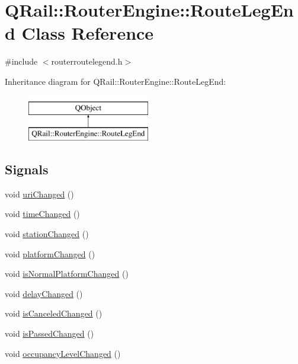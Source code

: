 \hypertarget{classQRail_1_1RouterEngine_1_1RouteLegEnd}{}\section{Q\+Rail\+::Router\+Engine\+::Route\+Leg\+End Class Reference}
\label{classQRail_1_1RouterEngine_1_1RouteLegEnd}


{\ttfamily \#include $<$routerroutelegend.\+h$>$}

Inheritance diagram for Q\+Rail\+::Router\+Engine\+::Route\+Leg\+End\+:\begin{figure}[H]
\begin{center}
\leavevmode
\includegraphics[height=2.000000cm]{classQRail_1_1RouterEngine_1_1RouteLegEnd}
\end{center}
\end{figure}
\subsection*{Signals}
\begin{DoxyCompactItemize}
\item 
void \mbox{\hyperlink{classQRail_1_1RouterEngine_1_1RouteLegEnd_a44cb65a3c2119ca9410522c255e10acb}{uri\+Changed}} ()
\item 
void \mbox{\hyperlink{classQRail_1_1RouterEngine_1_1RouteLegEnd_aabeab5a2d99f541ea43c7480fb2fabb5}{time\+Changed}} ()
\item 
void \mbox{\hyperlink{classQRail_1_1RouterEngine_1_1RouteLegEnd_ae41fc354a347de7eb389e7ff477b5765}{station\+Changed}} ()
\item 
void \mbox{\hyperlink{classQRail_1_1RouterEngine_1_1RouteLegEnd_af55c945b4378b108e02a40a547305186}{platform\+Changed}} ()
\item 
void \mbox{\hyperlink{classQRail_1_1RouterEngine_1_1RouteLegEnd_a29d4a5e4b98624e283b4575d3c9b1e6e}{is\+Normal\+Platform\+Changed}} ()
\item 
void \mbox{\hyperlink{classQRail_1_1RouterEngine_1_1RouteLegEnd_a0e79197c6f60d12d6c2e3edb66e8e232}{delay\+Changed}} ()
\item 
void \mbox{\hyperlink{classQRail_1_1RouterEngine_1_1RouteLegEnd_a4d669d2765d9ca86c36152d1b8052fb2}{is\+Canceled\+Changed}} ()
\item 
void \mbox{\hyperlink{classQRail_1_1RouterEngine_1_1RouteLegEnd_ae2986293ca553e7e980044e42a2d918b}{is\+Passed\+Changed}} ()
\item 
void \mbox{\hyperlink{classQRail_1_1RouterEngine_1_1RouteLegEnd_a8bf0ac21fde68905682ec95d557c198c}{occupancy\+Level\+Changed}} ()
\end{DoxyCompactItemize}
